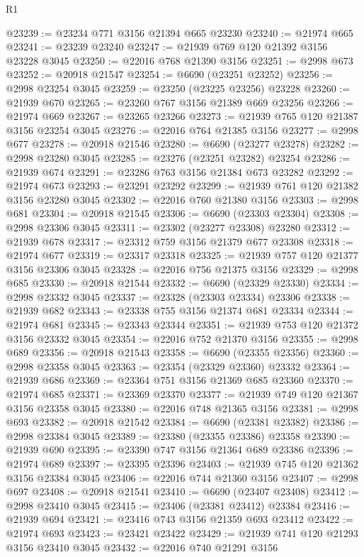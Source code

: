 \begin{lexlean}{R1}
\begin{coremodule}
@23239 := @23234 @771 @3156 @21394 @665 @23230
@23240 := @21974 @665
@23241 := @23239 @23240
@23247 := @21939 @769 @120 @21392 @3156 @23228 @3045
@23250 := @22016 @768 @21390 @3156
@23251 := @2998 @673
@23252 := @20918 @21547
@23254 := @6690 (@23251 @23252)
@23256 := @2998 @23254 @3045
@23259 := @23250 (@23225 @23256) @23228
@23260 := @21939 @670
@23265 := @23260 @767 @3156 @21389 @669 @23256
@23266 := @21974 @669
@23267 := @23265 @23266
@23273 := @21939 @765 @120 @21387 @3156 @23254 @3045
@23276 := @22016 @764 @21385 @3156
@23277 := @2998 @677
@23278 := @20918 @21546
@23280 := @6690 (@23277 @23278)
@23282 := @2998 @23280 @3045
@23285 := @23276 (@23251 @23282) @23254
@23286 := @21939 @674
@23291 := @23286 @763 @3156 @21384 @673 @23282
@23292 := @21974 @673
@23293 := @23291 @23292
@23299 := @21939 @761 @120 @21382 @3156 @23280 @3045
@23302 := @22016 @760 @21380 @3156
@23303 := @2998 @681
@23304 := @20918 @21545
@23306 := @6690 (@23303 @23304)
@23308 := @2998 @23306 @3045
@23311 := @23302 (@23277 @23308) @23280
@23312 := @21939 @678
@23317 := @23312 @759 @3156 @21379 @677 @23308
@23318 := @21974 @677
@23319 := @23317 @23318
@23325 := @21939 @757 @120 @21377 @3156 @23306 @3045
@23328 := @22016 @756 @21375 @3156
@23329 := @2998 @685
@23330 := @20918 @21544
@23332 := @6690 (@23329 @23330)
@23334 := @2998 @23332 @3045
@23337 := @23328 (@23303 @23334) @23306
@23338 := @21939 @682
@23343 := @23338 @755 @3156 @21374 @681 @23334
@23344 := @21974 @681
@23345 := @23343 @23344
@23351 := @21939 @753 @120 @21372 @3156 @23332 @3045
@23354 := @22016 @752 @21370 @3156
@23355 := @2998 @689
@23356 := @20918 @21543
@23358 := @6690 (@23355 @23356)
@23360 := @2998 @23358 @3045
@23363 := @23354 (@23329 @23360) @23332
@23364 := @21939 @686
@23369 := @23364 @751 @3156 @21369 @685 @23360
@23370 := @21974 @685
@23371 := @23369 @23370
@23377 := @21939 @749 @120 @21367 @3156 @23358 @3045
@23380 := @22016 @748 @21365 @3156
@23381 := @2998 @693
@23382 := @20918 @21542
@23384 := @6690 (@23381 @23382)
@23386 := @2998 @23384 @3045
@23389 := @23380 (@23355 @23386) @23358
@23390 := @21939 @690
@23395 := @23390 @747 @3156 @21364 @689 @23386
@23396 := @21974 @689
@23397 := @23395 @23396
@23403 := @21939 @745 @120 @21362 @3156 @23384 @3045
@23406 := @22016 @744 @21360 @3156
@23407 := @2998 @697
@23408 := @20918 @21541
@23410 := @6690 (@23407 @23408)
@23412 := @2998 @23410 @3045
@23415 := @23406 (@23381 @23412) @23384
@23416 := @21939 @694
@23421 := @23416 @743 @3156 @21359 @693 @23412
@23422 := @21974 @693
@23423 := @23421 @23422
@23429 := @21939 @741 @120 @21293 @3156 @23410 @3045
@23432 := @22016 @740 @21291 @3156

\end{coremodule}
\end{lexlean}
